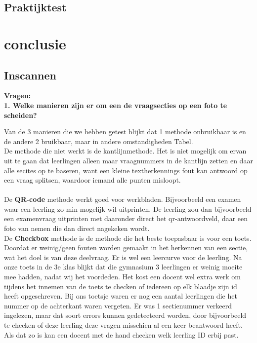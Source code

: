 \documentclass[12pt]{article}
\begin{document}
\pagebreak
\subsection{Praktijktest}

\pagebreak
\section{conclusie}
\subsection{Inscannen}
\textbf{Vragen:}\\
\textbf{1. Welke manieren zijn er om een de vraagsecties op een foto te scheiden?} 
\begin{multicols}{2}
Van de 3 manieren die we hebben getest blijkt dat 1 methode onbruikbaar is en de andere 2 bruikbaar, maar in andere omstandigheden Tabel.\\
De methode die niet werkt is de kantlijnmethode. Het is niet mogelijk om ervan uit te gaan dat leerlingen alleen maar vraagnummers in de kantlijn zetten en daar alle secites op te baseren, want een kleine textherkennings fout kan antwoord op een vraag splitsen, waardoor iemand alle punten misloopt. \\
\\
De \textbf{QR-code} methode werkt goed voor werkbladen. Bijvoorbeeld een examen waar een leerling zo min mogelijk wil uitprinten. De leerling zou dan bijvoorbeeld een examenvraag uitprinten met daaronder direct het qr-antwoordveld, daar een foto van nemen die dan direct nagekeken wordt. 
\\
De \textbf{Checkbox} methode is de methode die het beste toepasbaar is voor een toets. Doordat er weinig/geen fouten worden gemaakt in het herkennen van een sectie, wat het doel is van deze deelvraag. Er is wel een leercurve voor de leerling. Na onze toets in de 3e klas blijkt dat die gymnasium 3 leerlingen er weinig moeite mee hadden, nadat wij het voordeden. Het kost een docent wel extra werk om tijdens het innemen van de toets te checken of iedereen op elk blaadje zijn id heeft opgeschreven. Bij ons toetsje waren er nog een aantal leerlingen die het nummer op de achterkant waren vergeten. Er was 1 sectienummer verkeerd ingelezen, maar dat soort errors kunnen gedetecteerd worden, door bijvoorbeeld te checken of deze leerling deze vragen misschien al een keer beantwoord heeft. Als dat zo is kan een docent met de hand checken welk leerling ID erbij past. 

\end{multicols}
\end{document}
